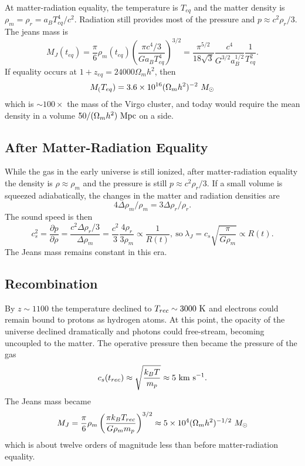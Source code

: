 \documentclass[]{article}
\begin{document}
At matter-radiation equality, the temperature is $T_{eq}$ and
the matter density is $\rho_m = \rho_r = a_B T_{eq}^4/c^2$.
Radiation still provides most of the pressure and
$p\approx c^2\rho_r/3$.  The jeans mass is
\begin{equation}
M_J(t_{eq}) = \frac{\pi}{6}\rho_m(t_{eq})\left(\frac{\pi c^4/3}{Ga_B T_{eq}^4}\right)^{3/2} = \frac{\pi^{5/2}}{18\sqrt{3}}\frac{c^4}{G^{3/2}a_B^{1/2}}\frac{1}{T_{eq}^2}.
\end{equation}
\noindent
If equality occurs at $1+z_{eq} = 24000\Omega_m h^{2}$, then
\begin{equation}
M_(T_{eq}) = 3.6 \times 10^{16}(\Omega_m h^2)^{-2}~M_{\odot}
\end{equation}
\noindent
which is $\sim 100\times$ the mass of the Virgo cluster, and
today would require the mean density in a volume $50/(\Omega_m h^2)~\mathrm{Mpc}$
on a side.

\subsection{After Matter-Radiation Equality}
While the gas in the early universe is still ionized, after
matter-radiation equality the density is $\rho\approx\rho_m$
and the pressure is still $p\approx c^2 \rho_r/3$.
If a small volume is squeezed adiabatically, the changes
in the matter and radiation densities are
\begin{equation}
4 \Delta \rho_m / \rho_m = 3 \Delta \rho_r/\rho_r.
\end{equation}
\noindent
The sound speed is then
\begin{equation}
c_s^2 = \frac{\partial p}{\partial \rho} = \frac{c^2 \Delta\rho_r/3}{\Delta \rho_m} = \frac{c^2}{3}\frac{4\rho_r}{3\rho_m}\propto \frac{1}{R(t)},~\mathrm{so}~\lambda_J = c_s\sqrt{\frac{\pi}{G\rho_m}}\propto R(t).
\end{equation}
\noindent
The Jeans mass remains constant in this era.

\subsection{Recombination}
By $z\sim1100$ the temperature declined to $T_{rec}\sim 3000~\mathrm{K}$ and
electrons could remain bound to protons as hydrogen atoms.  At this
point, the opacity of the universe declined dramatically and photons
could free-stream, becoming uncoupled to the matter.  The operative
pressure then became the pressure of the gas
\begin{equation}
c_s(t_{rec})\approx\sqrt{\frac{k_BT}{m_p}}\approx 5~\mathrm{km}~\mathrm{s}^{-1}.
\end{equation}
\noindent
The Jeans mass became
\begin{equation}
M_J = \frac{\pi}{6} \rho_m\left(\frac{\pi k_B T_{rec}}{G\rho_m m_p}\right)^{3/2} \approx 5\times 10^4 (\Omega_m h^2)^{-1/2}~M_{\odot}
\end{equation}
\noindent
which is about twelve orders of magnitude less than before
matter-radiation equality.
\end{document}
